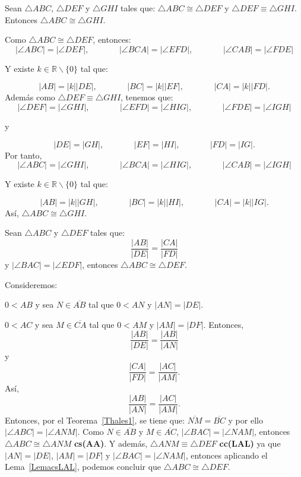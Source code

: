 \begin{lema}\label{LemacsLAL}
Sean $\triangle ABC$, $\triangle DEF$ y $\triangle GHI$ tales que: $\triangle ABC \cong \triangle DEF$ y $\triangle DEF \equiv \triangle GHI.$ Entonces $\triangle ABC \cong \triangle GHI.$
\end{lema}
\begin{dem}
Como $\triangle ABC \cong \triangle DEF$, entonces: 
$$|\angle ABC|=|\angle DEF|,  \;\;\;\;\;\;\;\;\;\;\;\;\; |\angle BCA|=|\angle EFD|,  \;\;\;\;\;\;\;\;\;\;\;\;\; |\angle CAB|=|\angle FDE|$$
	
Y existe $ k \in \mathbb{R} \backslash \{0\}$ tal que:
	
$$|AB|=|k||DE|,  \;\;\;\;\;\;\;\;\;\;\;\;\; |BC|=|k||EF|,  \;\;\;\;\;\;\;\;\;\;\;\;\; |CA|=|k||FD|.$$
Además como $\triangle DEF \equiv \triangle GHI$, tenemos que:
$$|\angle DEF|=|\angle GHI|,  \;\;\;\;\;\;\;\;\;\;\;\;\; |\angle EFD|=|\angle HIG|,  \;\;\;\;\;\;\;\;\;\;\;\;\; |\angle FDE|=|\angle IGH|$$
	
y
	
$$|DE|=|GH|,  \;\;\;\;\;\;\;\;\;\;\;\;\; |EF|=|HI|,  \;\;\;\;\;\;\;\;\;\;\;\;\; |FD|=|IG|.$$
Por tanto,
$$|\angle ABC|=|\angle GHI|,  \;\;\;\;\;\;\;\;\;\;\;\;\; |\angle BCA|=|\angle HIG|,  \;\;\;\;\;\;\;\;\;\;\;\;\; |\angle CAB|=|\angle IGH|$$
	
Y existe $ k \in \mathbb{R} \backslash \{0\}$ tal que:
	
$$|AB|=|k||GH|,  \;\;\;\;\;\;\;\;\;\;\;\;\; |BC|=|k||HI|,  \;\;\;\;\;\;\;\;\;\;\;\;\; |CA|=|k||IG|.$$
Así, $\triangle ABC \cong \triangle GHI.$
\end{dem}
	
\begin{teo}
Sean $\triangle ABC$ y $\triangle DEF$ tales que: 
$$\frac{|AB|}{|DE|}=\frac{|CA|}{|FD|}$$ y $|\angle BAC|=|\angle EDF|$, entonces $\triangle ABC \cong \triangle DEF.$
\end{teo}
\begin{dem}
Consideremos:
	
$0<AB$ y sea $N \in \overline{AB}$ tal que $0<AN$ y $|AN|=|DE|$.
	
$0<AC$ y sea $M \in \overline{CA}$ tal que $0<AM$ y $|AM|=|DF|$.
Entonces,
$$\frac{|AB|}{|DE|}=\frac{|AB|}{|AN|}$$ y $$\frac{|CA|}{|FD|}=\frac{|AC|}{|AM|}.$$
Así, $$\frac{|AB|}{|AN|}=\frac{|AC|}{|AM|}.$$
Entonces, por el Teorema~\ref{Thales1}, se tiene que: $\overline{NM}=\overline{BC}$ y por ello $|\angle ABC|=|\angle ANM|$. Como $N \in \overline{AB}$ y $M \in \overline{AC}$, $|\angle BAC|=|\angle NAM|$, entonces $\triangle ABC \cong \triangle ANM$ \textbf{cs(AA)}. Y además, $\triangle ANM \equiv \triangle DEF$ \textbf{cc(LAL)} ya que $|AN|=|DE|$, $|AM|=|DF|$ y $|\angle BAC|=|\angle NAM|$, entonces aplicando el Lema~\ref{LemacsLAL}, podemos concluir que $\triangle ABC \cong \triangle DEF.$ 
\end{dem}
	
